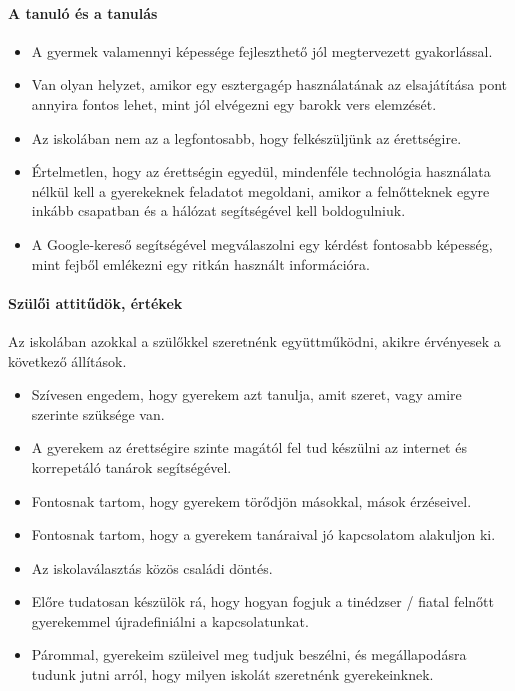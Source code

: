 \paragraph{A tanuló és a tanulás}
\begin{itemize}
  \item
  A gyermek valamennyi képessége fejleszthető jól megtervezett gyakorlással.
\item
Van olyan helyzet, amikor egy esztergagép használatának az elsajátítása pont annyira fontos lehet, mint jól elvégezni egy barokk vers elemzését.
\item
Az iskolában nem az a legfontosabb, hogy felkészüljünk az érettségire.
\item
Értelmetlen, hogy az érettségin egyedül, mindenféle technológia használata nélkül kell a gyerekeknek feladatot megoldani, amikor a felnőtteknek egyre inkább csapatban és a hálózat segítségével kell boldogulniuk.
\item A Google-kereső segítségével megválaszolni egy kérdést fontosabb képesség, mint fejből emlékezni egy ritkán használt információra.
\end{itemize}

\paragraph{Szülői attitűdök, értékek}
Az iskolában azokkal a szülőkkel szeretnénk együttműködni, akikre érvényesek a következő állítások.

\begin{itemize}
\item Szívesen engedem, hogy gyerekem azt tanulja, amit szeret, vagy amire szerinte szüksége van.
\item A gyerekem az érettségire szinte magától fel tud készülni az internet és korrepetáló tanárok segítségével.
\item Fontosnak tartom, hogy gyerekem törődjön másokkal, mások érzéseivel.
\item Fontosnak tartom, hogy a gyerekem tanáraival jó kapcsolatom alakuljon ki.
\item Az iskolaválasztás közös családi döntés.
\item Előre tudatosan készülök rá, hogy hogyan fogjuk a tinédzser / fiatal felnőtt gyerekemmel újradefiniálni a kapcsolatunkat.
\item Párommal, gyerekeim szüleivel meg tudjuk beszélni, és megállapodásra tudunk jutni arról, hogy milyen iskolát szeretnénk gyerekeinknek.

\end{itemize}

